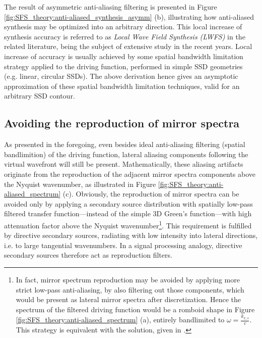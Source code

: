 The result of asymmetric anti-aliasing filtering is presented in Figure \ref{fig:SFS_theory:anti-aliased_synthesis_asymm} (b), illustrating how anti-aliased synthesis may be optimized into an arbitrary direction.
This local increase of synthesis accuracy is referred to as \emph{Local Wave Field Synthesis (LWFS)} in the related literature, being the subject of extensive study in the recent years. \cite{ahrens2010local, 5946329, spors2011local, Winter15:EURONOISE, Winter15:AES, Hahn17:EUSIPCO, Hahn16:AES, Winter2016-TASL}
Local increase of accuracy is usually achieved by some spatial bandwidth limitation strategy applied to the driving function, performed in simple SSD geometries (e.g. linear, circular SSDs).
The above derivation hence gives an asymptotic approximation of these spatial bandwidth limitation techniques, valid for an arbitrary SSD contour.

\subsection{Avoiding the reproduction of mirror spectra}

As presented in the foregoing, even besides ideal anti-aliasing filtering (spatial bandlimition) of the driving function, lateral aliasing components following the virtual wavefront will still be present.
Mathematically, these aliasing artifacts originate from the reproduction of the adjacent mirror spectra components above the Nyquist wavenumber, as illustrated in Figure \ref{fig:SFS_theory:anti-aliased_spectrum} (c).
Obviously, the reproduction of mirror spectra can be avoided only by applying a secondary source distribution with spatially low-pass filtered transfer function---instead of the simple 3D Green's function---with high attenuation factor above the Nyquist wavenumber\footnote{In fact, mirror spectrum reproduction may be avoided by applying more strict low-pass anti-aliasing, by also filtering out those components, which would be present as lateral mirror spectra after discretization. 
Hence the spectrum of the filtered driving function would be a romboid shape in Figure \ref{fig:SFS_theory:anti-aliased_spectrum} (a), entirely bandlimited to $\omega = \frac{k_{x,s}}{c}$.
This strategy is equivalent with the solution, given in \cite{Winter2018:GeometricModel}.}.
This requirement is fulfilled by directive secondary sources, radiating with low intensity into lateral directions, i.e. to large tangential wavenumbers.
In a signal processing analogy, directive secondary sources therefore act as reproduction filters.

